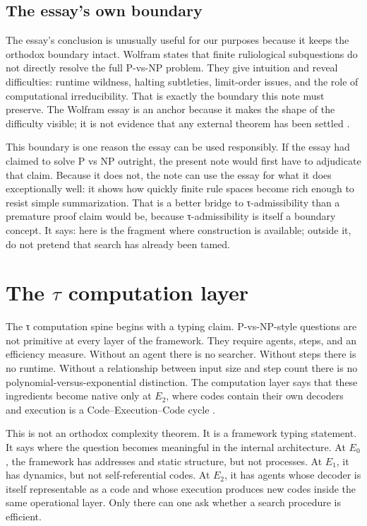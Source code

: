 \documentclass{pantarhei-researchnote}
\newcommand{\Ezero}{\ensuremath{E_0}}
\newcommand{\Eone}{\ensuremath{E_1}}
\newcommand{\Etwo}{\ensuremath{E_2}}
\begin{document}
\subsection{The essay's own boundary}

The essay's conclusion is unusually useful for our purposes because it
keeps the orthodox boundary intact. Wolfram states that finite
ruliological subquestions do not directly resolve the full P-vs-NP
problem. They give intuition and reveal difficulties: runtime wildness,
halting subtleties, limit-order issues, and the role of computational
irreducibility. That is exactly the boundary this note must preserve. The
Wolfram essay is an anchor because it makes the shape of the difficulty
visible; it is not evidence that any external theorem has been settled
\cite{Wolfram2026RuliologicalPNP}.

This boundary is one reason the essay can be used responsibly. If the
essay had claimed to solve P vs NP outright, the present note would first
have to adjudicate that claim. Because it does not, the note can use the
essay for what it does exceptionally well: it shows how quickly finite
rule spaces become rich enough to resist simple summarization. That is a
better bridge to τ-admissibility than a premature proof claim would be,
because τ-admissibility is itself a boundary concept. It says: here is
the fragment where construction is available; outside it, do not pretend
that search has already been tamed.

\section{The \texorpdfstring{$\tau$}{tau} computation layer}
\label{sec:tau-layer}

The τ computation spine begins with a typing claim. P-vs-NP-style
questions are not primitive at every layer of the framework. They require
agents, steps, and an efficiency measure. Without an agent there is no
searcher. Without steps there is no runtime. Without a relationship
between input size and step count there is no polynomial-versus-exponential
distinction. The computation layer says that these ingredients become
native only at \Etwo, where codes contain their own decoders and execution
is a Code--Execution--Code cycle \cite{PR-III}.

This is not an orthodox complexity theorem. It is a framework typing
statement. It says where the question becomes meaningful in the internal
architecture. At \Ezero, the framework has addresses and static structure,
but not processes. At \Eone, it has dynamics, but not self-referential
codes. At \Etwo, it has agents whose decoder is itself representable as a
code and whose execution produces new codes inside the same operational
layer. Only there can one ask whether a search procedure is efficient.
\end{document}
